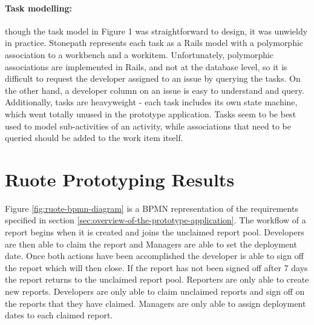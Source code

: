 \documentclass[document.tex]{subfiles}
\begin{document}
\paragraph{Task modelling:} though the task model in Figure 1 was straightforward to design, it was unwieldy in practice. Stonepath represents each task as a Rails model with a polymorphic association to a workbench and a workitem. Unfortunately, polymorphic associations are implemented in Rails, and not at the database level, so it is difficult to request the developer assigned to an issue by querying the tasks. On the other hand, a developer column on an issue is easy to understand and query. Additionally, tasks are heavyweight - each task includes its own state machine, which went totally unused in the prototype application. Tasks seem to be best used to model sub-activities of an activity, while associations that need to be queried should be added to the work item itself.


\FloatBarrier

\section {Ruote Prototyping Results}
\label {sec:ruote-prototyping-results}

Figure \ref{fig:ruote-bpmn-diagram} is a BPMN representation of the requirements specified in section \ref{sec:overview-of-the-prototype-application}. The workflow of a report begins when it is created and joins the unclaimed report pool. Developers are then able to claim the report and Managers are able to set the deployment date. Once both actions have been accomplished the developer is able to sign off the report which will then close. If the report has not been signed off after 7 days the report returns to the unclaimed report pool. Reporters are only able to create new reports. Developers are only able to claim unclaimed reports and sign off on the reports that they have claimed. Managers are only able to assign deployment dates to each claimed report.
\end{document}
